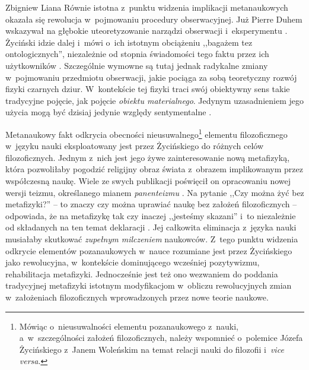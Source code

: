 \begin{artplenv}{Zbigniew Liana}
Równie istotna z~punktu widzenia implikacji metanaukowych okazała się rewolucja w~pojmowaniu procedury obserwacyjnej.
Już Pierre Duhem wskazywał na głębokie uteoretyzowanie narządzi obserwacji i~eksperymentu
\parencite[zob.][s.~77–81; 85–89]{duhem_pierre_1991}.
Życiński idzie dalej i~mówi o~ich istotnym
obciążeniu ,,bagażem tez ontologicznych'', niezależnie od stopnia świadomości tego faktu przez ich użytkowników
\parencite[s.~249]{zycinski_jezyk_1983}.
 Szczególnie wymowne są tutaj jednak radykalne zmiany w~pojmowaniu
przedmiotu obserwacji, jakie pociąga za sobą teoretyczny rozwój fizyki czarnych dziur. W~kontekście tej fizyki traci
swój obiektywny sens takie tradycyjne pojęcie, jak pojęcie \textit{obiektu materialnego}. Jedynym uzasadnieniem jego
użycia mogą być dzisiaj jedynie względy sentymentalne
\parencites[s.~77]{zycinski_structure_1988}[s.~137n]{zycinski_struktura_2013}.

Metanaukowy fakt odkrycia obecności nieusuwalnego\footnote{Mówiąc o~nieusuwalności elementu
pozanaukowego z~nauki, a~w~szczególności założeń filozoficznych,
należy wspomnieć o~polemice Józefa Życińskiego
\parencite*{zycinski_czy_2009}
z~Janem Woleńskim
\parencite*{wolenski_odpowiedz_2009}
na temat relacji nauki do filozofii i~\textit{vice versa}.
} elementu
filozoficznego w~języku nauki eksploatowany jest przez Życińskiego do różnych celów filozoficznych. Jednym z~nich jest
jego żywe zainteresowanie nową metafizyką, która pozwoliłaby pogodzić religijny obraz świata z~obrazem implikowanym
przez współczesną naukę. Wiele ze swych publikacji poświęcił on opracowaniu nowej wersji teizmu, określanego mianem
\textit{panenteizmu} \parencite[zob. np.][]{zycinski_teizm_1988}.
Na pytanie ,,Czy można żyć bez metafizyki?'' -- to znaczy
czy można uprawiać naukę bez założeń filozoficznych -- odpowiada, że na metafizykę tak czy inaczej
,,jesteśmy skazani'' i~to niezależnie od składanych na ten temat
deklaracji
\parencite[s.~246.249]{zycinski_jezyk_1983}.
Jej całkowita eliminacja z~języka nauki musiałaby skutkować \textit{zupełnym milczeniem} naukowców. Z~tego punktu widzenia
odkrycie elementów pozanaukowych w~nauce rozumiane jest przez Życińskiego jako rewolucyjna, w~kontekście dominującego
wcześniej pozytywizmu, rehabilitacja metafizyki. Jednocześnie jest też ono wezwaniem do poddania tradycyjnej metafizyki
istotnym modyfikacjom w~obliczu rewolucyjnych zmian w~założeniach filozoficznych wprowadzonych przez nowe teorie
naukowe. 


\end{artplenv}
